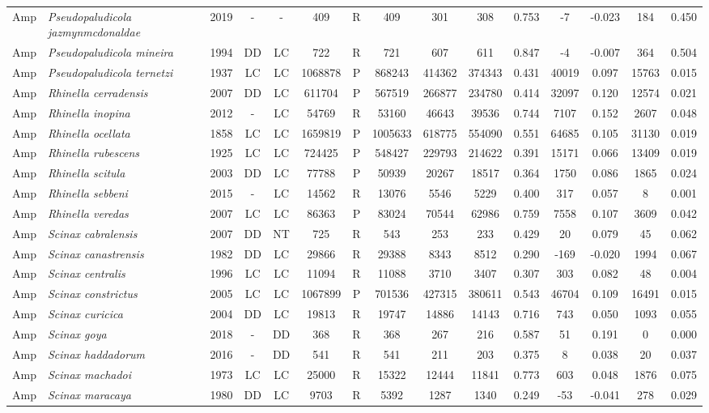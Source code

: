 \documentclass[12pt,openright,oneside,a4paper,english]{abntex2}
\begin{document}
\begin{landscape}
\begin{longtable}{llccccccccccccc}
		Amp&\textit{Pseudopaludicola jazmynmcdonaldae}&2019&-&-&409&R&409&301&308&0.753&-7&-0.023&184&0.450\\
		Amp&\textit{Pseudopaludicola mineira}&1994&DD&LC&722&R&721&607&611&0.847&-4&-0.007&364&0.504\\
		Amp&\textit{Pseudopaludicola ternetzi}&1937&LC&LC&1068878&P&868243&414362&374343&0.431&40019&0.097&15763&0.015\\
		Amp&\textit{Rhinella cerradensis}&2007&DD&LC&611704&P&567519&266877&234780&0.414&32097&0.120&12574&0.021\\
		Amp&\textit{Rhinella inopina}&2012&-&LC&54769&R&53160&46643&39536&0.744&7107&0.152&2607&0.048\\
		Amp&\textit{Rhinella ocellata}&1858&LC&LC&1659819&P&1005633&618775&554090&0.551&64685&0.105&31130&0.019\\
		Amp&\textit{Rhinella rubescens}&1925&LC&LC&724425&P&548427&229793&214622&0.391&15171&0.066&13409&0.019\\
		Amp&\textit{Rhinella scitula}&2003&DD&LC&77788&P&50939&20267&18517&0.364&1750&0.086&1865&0.024\\
		Amp&\textit{Rhinella sebbeni}&2015&-&LC&14562&R&13076&5546&5229&0.400&317&0.057&8&0.001\\
		Amp&\textit{Rhinella veredas}&2007&LC&LC&86363&P&83024&70544&62986&0.759&7558&0.107&3609&0.042\\
		Amp&\textit{Scinax cabralensis}&2007&DD&NT&725&R&543&253&233&0.429&20&0.079&45&0.062\\
		Amp&\textit{Scinax canastrensis}&1982&DD&LC&29866&R&29388&8343&8512&0.290&-169&-0.020&1994&0.067\\
		Amp&\textit{Scinax centralis}&1996&LC&LC&11094&R&11088&3710&3407&0.307&303&0.082&48&0.004\\
		Amp&\textit{Scinax constrictus}&2005&LC&LC&1067899&P&701536&427315&380611&0.543&46704&0.109&16491&0.015\\
		Amp&\textit{Scinax curicica}&2004&DD&LC&19813&R&19747&14886&14143&0.716&743&0.050&1093&0.055\\
		Amp&\textit{Scinax goya}&2018&-&DD&368&R&368&267&216&0.587&51&0.191&0&0.000\\
		Amp&\textit{Scinax haddadorum}&2016&-&DD&541&R&541&211&203&0.375&8&0.038&20&0.037\\
		Amp&\textit{Scinax machadoi}&1973&LC&LC&25000&R&15322&12444&11841&0.773&603&0.048&1876&0.075\\
		Amp&\textit{Scinax maracaya}&1980&DD&LC&9703&R&5392&1287&1340&0.249&-53&-0.041&278&0.029\\

\end{longtable}
\end{landscape}
\end{document}
